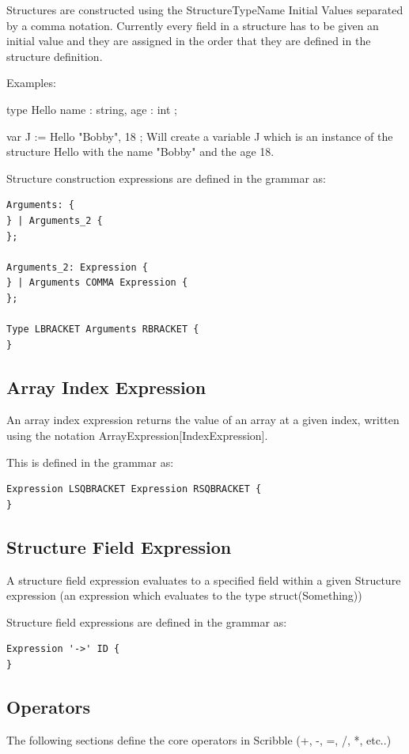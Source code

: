 \documentclass[]{final_report}
\begin{document}
Structures are constructed using the StructureTypeName { Initial Values separated by a comma } notation. Currently every field in a structure has to be given an initial value and they are assigned in the order that they are defined in the structure definition.

Examples:

type Hello { 
	name : string,
	age : int
};

var J := Hello{ "Bobby", 18 };
Will create a variable J which is an instance of the structure Hello with the name "Bobby" and the age 18.

Structure construction expressions are defined in the grammar as:
\begin{verbatim}
Arguments: {
} | Arguments_2 {
};

Arguments_2: Expression {
} | Arguments COMMA Expression {
};

Type LBRACKET Arguments RBRACKET {
}
\end{verbatim}

\subsection{Array Index Expression}

An array index expression returns the value of an array at a given index, written using the notation ArrayExpression[IndexExpression].

This is defined in the grammar as: \begin{verbatim}
Expression LSQBRACKET Expression RSQBRACKET {
}
\end{verbatim}

\subsection{Structure Field Expression}

A structure field expression evaluates to a specified field within a given Structure expression (an expression which evaluates to the type struct(Something))

Structure field expressions are defined in the grammar as:
\begin{verbatim}
Expression '->' ID {
}
\end{verbatim}

\subsection{Operators}

The following sections define the core operators in Scribble (+, -, =, /, *, etc..)
\end{document}
